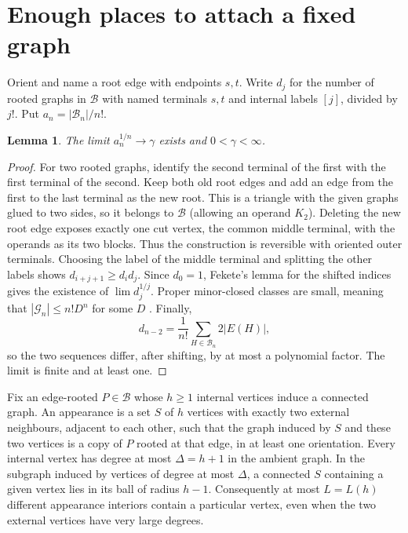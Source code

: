\documentclass[11pt]{article}
\newtheorem{lemma}[theorem]{Lemma}
\newcommand{\B}{\mathcal B}
\newcommand{\G}{\mathcal G}
\begin{document}
\section{Enough places to attach a fixed graph}
Orient and name a root edge with endpoints $s,t$. Write $d_j$ for the number of rooted graphs in $\B$ with named terminals $s,t$ and internal labels $[j]$, divided by $j!$. Put $a_n=|\B_n|/n!$.
\begin{lemma}\label{growth}
The limit $a_n^{1/n}\to\gamma$ exists and $0<\gamma<\infty$.
\end{lemma}
\begin{proof}
For two rooted graphs, identify the second terminal of the first with the first terminal of the second. Keep both old root edges and add an edge from the first to the last terminal as the new root. This is a triangle with the given graphs glued to two sides, so it belongs to $\B$ (allowing an operand $K_2$). Deleting the new root edge exposes exactly one cut vertex, the common middle terminal, with the operands as its two blocks. Thus the construction is reversible with oriented outer terminals. Choosing the label of the middle terminal and splitting the other labels shows $d_{i+j+1}\ge d_i d_j$. Since $d_0=1$, Fekete's lemma for the shifted indices gives the existence of $\lim d_j^{1/j}$. Proper minor-closed classes are small, meaning that $|\G_n|\le n!D^n$ for some $D$ \cite{hmnt}. Finally,
\[
 d_{n-2}=\frac{1}{n!}\sum_{H\in\B_n}2|E(H)|,
\]
so the two sequences differ, after shifting, by at most a polynomial factor. The limit is finite and at least one.
\end{proof}

Fix an edge-rooted $P\in\B$ whose $h\ge1$ internal vertices induce a connected graph. An appearance is a set $S$ of $h$ vertices with exactly two external neighbours, adjacent to each other, such that the graph induced by $S$ and these two vertices is a copy of $P$ rooted at that edge, in at least one orientation. Every internal vertex has degree at most $\Delta=h+1$ in the ambient graph. In the subgraph induced by vertices of degree at most $\Delta$, a connected $S$ containing a given vertex lies in its ball of radius $h-1$. Consequently at most $L=L(h)$ different appearance interiors contain a particular vertex, even when the two external vertices have very large degrees.
\end{document}

